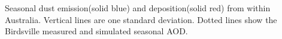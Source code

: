 \label{fig:seasonaldust}
Seasonal dust emission(solid blue) and deposition(solid red) from within Australia.
Vertical lines are one standard deviation.
Dotted lines show the Birdsville measured and simulated seasonal AOD.
